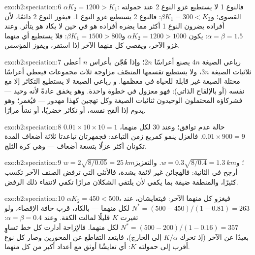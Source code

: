 \begin{solution}{exo:b2:speciation:6}
$\alpha K_2 = 1200 > K_1$: فالنوع 1 لا يستطيع غزو النوع 2 عند
حمولته القصوى؛ و$\beta K_1 = 300 < K_2$: فالنوع 2 يستطيع غزو
النوع 1. فيفوز النوع 2 دائمًا، لأن أفراده يضرون
النوع 1 أكثر مما يضره أفراده هو في حين لا يكاد هو يتأثر.
وعند $\alpha = \beta = 1.5$: يكون $\alpha K_2 = 1200 > 1000$
و$\beta K_1 = 1500 > 800$: فلا يستطيع أي منهما غزو الآخر، ويقصي كل
منهما الآخر إذا استقر، ويفوز المؤسس.
\end{solution}

\begin{solution}{exo:b2:speciation:7}
رباعي الصيغة $4n$ يصنع أعراسًا $2n$؛ وإذا هُجّن بأعراس 
$n$ أعطى ثلاثيات الصيغة $3n$، ولا يستطيع تقسمها المنصّف مزاوجة ثلاث
مجموعات فيعطي أعراسًا مختلة الصيغة غير قابلة للحياة في معظمها. و
رباعي الصيغة لا يستطيع التكاثر إلا مع نفسه (أو بالإلقاح الذاتي): فهو معزول في
خطوة واحدة. وهو يخفق عادةً لأنه وحيد --- فشركاؤه المحتملون
الوحيدون ثنائيات الصيغة وكل تهجين كهذا مهدور ---
فيُغمر؛ وهو يدوم إذا ألقح نفسه، أو تكاثر خضريًا،
أو نشأ مرارًا.
\end{solution}

\begin{solution}{exo:b2:speciation:8}
$0.01\times 10\times 10 = 1$ حالة عدم توافق؛ وعند 30 لكل منهما، $0.01\times
900 = 9$. فالعزل ينمو كمربع زمن التباعد: فجمهرتان
تباعدتا ثلاثة أضعاف المدة تكونان أكثر عزلًا بتسعة
أضعاف --- وهي كرة الثلج.
\end{solution}

\begin{solution}{exo:b2:speciation:9}
$w = 2\sqrt{8/0.05} = \qty{25}{km}$؛ و$w = 0.3\sqrt{8/0.4} =
\qty{1.3}{km}$. والتعزيز أرجح في الثانية: فالهجائن
غير لائقة بشدة، فالأنثى التي ترفض الصنف الآخر تكسب
كثيرًا، والمنطقة ضيقة بما يكفي لأن يلتقي الشكلان مرارًا
تكفي لانتقاء ذلك الرفض.
\end{solution}

\begin{solution}{exo:b2:speciation:10}
$\alpha K_2 = 450 < 500$، فيغزو كل منهما الآخر: فيتعايشان،
عند $N^{*} = (500 - 450)/(1 - 0.81) = 263$ لكل منهما --- بالكاد، قرب
حافة الإقصاء، ولو تغيرت $K$ قليلًا لمالت الكفة. وعند
$\alpha = \beta = 0.4$: $N^{*} = (500 - 200)/(1 - 0.16) = 357$ لكل منهما.
فالإزاحة أدارت كل خط تساوٍ بعيدًا عن الآخر (إذ تحرك $K/\alpha$
إلى الخارج)، فابتعد التقاطع عن المحورين وصار كل
نوع أقرب إلى حمولته $K$: أي تعايشًا أوثق مع
أعداد أكبر من كل منهما.
\end{solution}

